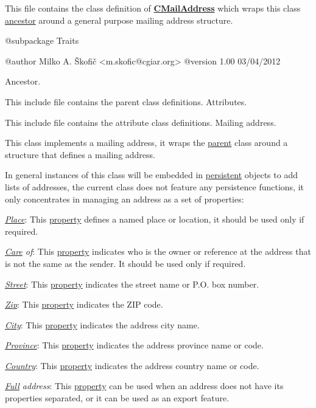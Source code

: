 This file contains the class definition of {\bfseries \hyperlink{class_c_mail_address}{C\-Mail\-Address}} which wraps this class \hyperlink{class_c_array_object}{ancestor} around a general purpose mailing address structure.

\begin{DoxyVerb} @subpackage        Traits

 @author            Milko A. Škofič <m.skofic@cgiar.org>
 @version   1.00 03/04/2012\end{DoxyVerb}


Ancestor.

This include file contains the parent class definitions. Attributes.

This include file contains the attribute class definitions. Mailing address.

This class implements a mailing address, it wraps the \hyperlink{class_c_array_object}{parent} class around a structure that defines a mailing address.

In general instances of this class will be embedded in \hyperlink{class_c_persistent_object}{persistent} objects to add lists of addresses, the current class does not feature any persistence functions, it only concentrates in managing an address as a set of properties\-:


\begin{DoxyItemize}
\item {\itshape \hyperlink{}{Place}}\-: This \hyperlink{}{property} defines a named place or location, it should be used only if required. 
\item {\itshape \hyperlink{}{Care} of}\-: This \hyperlink{}{property} indicates who is the owner or reference at the address that is not the same as the sender. It should be used only if required. 
\item {\itshape \hyperlink{}{Street}}\-: This \hyperlink{}{property} indicates the street name or P.\-O. box number. 
\item {\itshape \hyperlink{}{Zip}}\-: This \hyperlink{}{property} indicates the Z\-I\-P code. 
\item {\itshape \hyperlink{}{City}}\-: This \hyperlink{}{property} indicates the address city name. 
\item {\itshape \hyperlink{}{Province}}\-: This \hyperlink{}{property} indicates the address province name or code. 
\item {\itshape \hyperlink{}{Country}}\-: This \hyperlink{}{property} indicates the address country name or code. 
\item {\itshape \hyperlink{}{Full} address}\-: This \hyperlink{}{property} can be used when an address does not have its properties separated, or it can be used as an export feature. 
\end{DoxyItemize}

